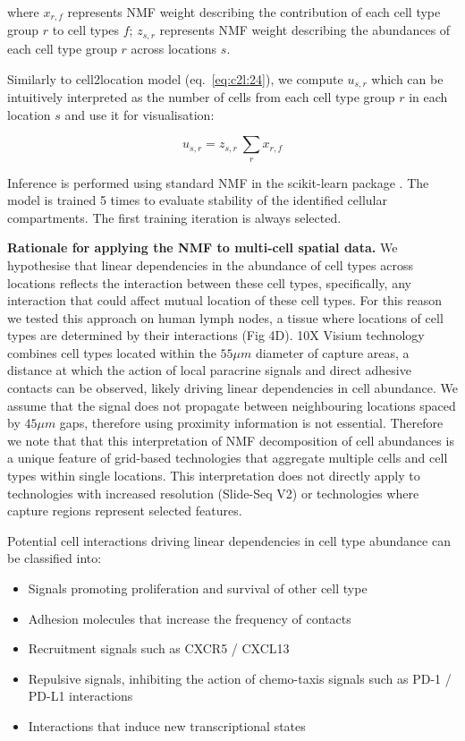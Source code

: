 \documentclass[11pt,a4paper]{article}
\begin{document}
where $x_{r,f}$ represents NMF weight describing the contribution of each cell type group $r$ to cell types $f$; $z_{s,r}$ represents NMF weight describing the abundances of each cell type group $r$ across locations $s$.

Similarly to cell2location model (eq.~\eqref{eq:c2l:24}), we compute $u_{s,r}$ which can be intuitively interpreted as the number of cells from each cell type group $r$ in each location $s$ and use it for visualisation:

\begin{linenomath*} \begin{equation} \label{eq:circ:2}
u_{s,r} = z_{s,r} \: \sum_{r} x_{r,f}
\end{equation} \end{linenomath*}

Inference is performed using standard NMF in the scikit-learn package \autocite{pedregosa_scikit-learn_2011}. The model is trained 5 times to evaluate stability of the identified cellular compartments. The first training iteration is always selected. 

\textbf{Rationale for applying the NMF to multi-cell spatial data.} We hypothesise that linear dependencies in the abundance of cell types across locations reflects the interaction between these cell types, specifically, any interaction that could affect mutual location of these cell types. For this reason we tested this approach on human lymph nodes, a tissue where locations of cell types are determined by their interactions (Fig 4D). 10X Visium technology combines cell types located within the $55\mu m$ diameter of capture areas, a distance at which the action of local paracrine signals and direct adhesive contacts can be observed, likely driving linear dependencies in cell abundance. We assume that the signal does not propagate between neighbouring locations spaced by $45\mu m$ gaps, therefore using proximity information is not essential. Therefore we note that that this interpretation of NMF decomposition of cell abundances is a unique feature of grid-based technologies that aggregate multiple cells and cell types within single locations. This interpretation does not directly apply to technologies with increased resolution (Slide-Seq V2) or technologies where capture regions represent selected features. 

Potential cell interactions driving linear dependencies in cell type abundance can be classified into:
\begin{itemize}
    \item Signals promoting proliferation and survival of other cell type
    \item Adhesion molecules that increase the frequency of contacts 
    \item Recruitment signals such as CXCR5 / CXCL13 \autocite{van_de_pavert_chemokine_2009}
    \item Repulsive signals, inhibiting the action of chemo-taxis signals such as PD-1 / PD-L1 interactions \autocite{shi_pd-1_2018}
    \item Interactions that induce new transcriptional states 
\end{itemize}
\end{document}
